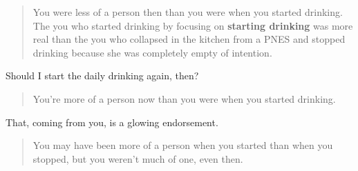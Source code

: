 \begin{quote}
You were less of a person then than you were when you started drinking. The you who started drinking by focusing on \textbf{starting drinking} was more real than the you who collapsed in the kitchen from a PNES and stopped drinking because she was completely empty of intention.
\end{quote}

Should I start the daily drinking again, then?

\begin{quote}
You're more of a person now than you were when you started drinking.
\end{quote}

That, coming from you, is a glowing endorsement.

\begin{quote}
You may have been more of a person when you started than when you stopped, but you weren't much of one, even then.
\end{quote}
